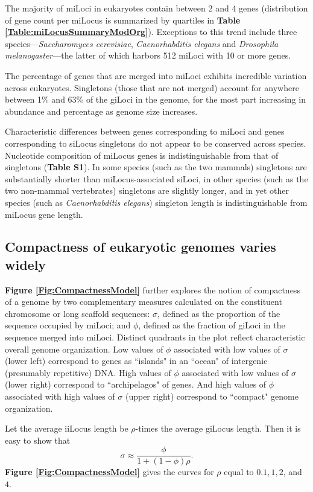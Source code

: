 The majority of miLoci in eukaryotes contain between 2 and 4 genes (distribution of gene count per miLocus is summarized by quartiles in \textbf{Table \ref{Table:miLocusSummaryModOrg}}).
Exceptions to this trend include three species---\textit{Saccharomyces cerevisiae}, \textit{Caenorhabditis elegans} and \textit{Drosophila melanogaster}---the latter of which harbors 512 miLoci with 10 or more genes.

The percentage of genes that are merged into miLoci exhibits incredible variation across eukaryotes.
Singletons (those that are not merged) account for anywhere between 1\% and 63\% of the giLoci in the genome, for the most part increasing in abundance and percentage as genome size increases.

Characteristic differences between genes corresponding to miLoci and genes corresponding to siLocus singletons do not appear to be conserved across species.
Nucleotide composition of miLocus genes is indistinguishable from that of singletons (\textbf{Table S1}).
In some species (such as the two mammals) singletons are substantially shorter than miLocus-associated siLoci, in other species (such as the two non-mammal vertebrates) singletons are slightly longer, and in yet other species (such as \textit{Caenorhabditis elegans}) singleton length is indistinguishable from miLocus gene length.

\subsection{Compactness of eukaryotic genomes varies widely}

\textbf{Figure \ref{Fig:CompactnessModel}} further explores the notion of compactness of a genome by two complementary measures calculated on the constituent chromosome or long scaffold sequences:
$\sigma$, defined as the proportion of the sequence occupied by miLoci;
and $\phi$, defined as the fraction of giLoci in the sequence merged into miLoci.
Distinct quadrants in the plot reflect characteristic overall genome organization.
Low values of $\phi$ associated with low values of $\sigma$ (lower left) correspond to genes as ``islands" in an ``ocean" of intergenic (presumably repetitive) DNA.
High values of $\phi$ associated with low values of $\sigma$ (lower right) correspond to ``archipelagos" of genes.
And high values of $\phi$ associated with high values of $\sigma$ (upper right) correspond to ``compact" genome organization.

Let the average iiLocus length be $\rho$-times the average giLocus length.
Then it is easy to show that
$$\sigma \approx \frac{\phi}{1 + (1-\phi)\rho}.$$
\textbf{Figure \ref{Fig:CompactnessModel}} gives the curves for $\rho$ equal to $0.1, 1, 2$, and $4$.

